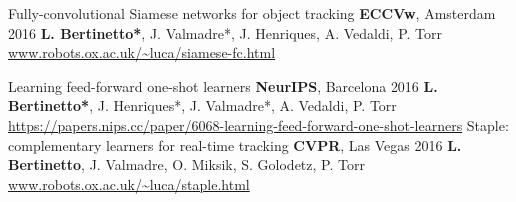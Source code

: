 
\begin{cvpapers}
  \cvpapertitle
    {Fully-convolutional Siamese networks for object tracking} %
    {\textbf{ECCVw}, Amsterdam} %
    {2016} %
  \cvpaperauthors
    {\textbf{L. Bertinetto*}, J. Valmadre*, J. Henriques, A. Vedaldi, P. Torr}
    {} %
    {} %
  \cvpaperurl
    {\href{http://www.robots.ox.ac.uk/~luca/siamese-fc.html}{www.robots.ox.ac.uk/\textasciitilde luca/siamese-fc.html}}
    {} %
    {} %

	
  \cvpapertitle
    {Learning feed-forward one-shot learners} %
    {\textbf{NeurIPS}, Barcelona} %
    {2016} %
  \cvpaperauthors
    {\textbf{L. Bertinetto*}, J. Henriques*, J. Valmadre*, A. Vedaldi, P. Torr}
    {} %
    {} %
  \cvpaperurl
    {\href{https://papers.nips.cc/paper/6068-learning-feed-forward-one-shot-learners}{https://papers.nips.cc/paper/6068-learning-feed-forward-one-shot-learners}}
    {} %
    {} %
  \cvpapertitle
    {Staple: complementary learners for real-time tracking} %
    {\textbf{CVPR}, Las Vegas} %
    {2016} %
  \cvpaperauthors
    {\textbf{L. Bertinetto}, J. Valmadre, O. Miksik, S. Golodetz, P. Torr}
    {} %
    {} %
  \cvpaperurl
    {\href{http://www.robots.ox.ac.uk/~luca/staple.html}{www.robots.ox.ac.uk/\textasciitilde luca/staple.html}}
    {} %
    {} %

\end{cvpapers}
